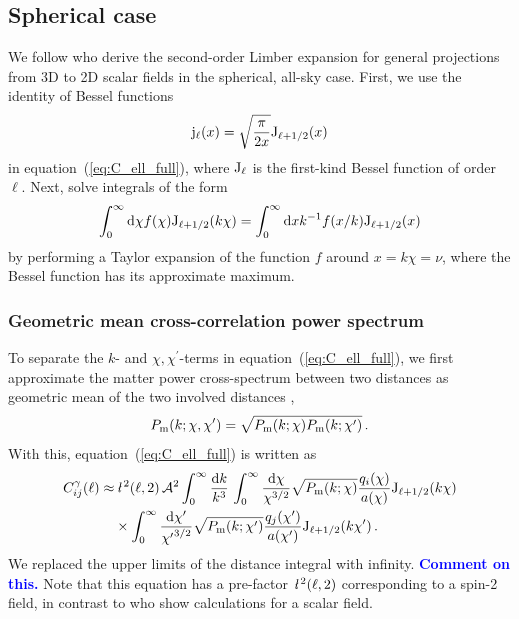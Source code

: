 \documentclass[fleqn,usenatbib]{mnras} %
\newcommand{\ellbar}{\hbox{\it \l}\,}
\newcommand{\pref}{{\cal A}}
\newcommand{\mk}[1]{{\bf\textcolor{blue}{#1}}}
\begin{document}
\subsection{Spherical case}

We follow \cite{2008PhRvD..78l3506L} who derive the second-order Limber
expansion for general projections from 3D to 2D scalar fields in the spherical,
all-sky case. First, we use the identity of Bessel functions
%
\begin{equation}
  {\rm j}_\ell(x) = \sqrt{\frac{\pi}{2x}} {\rm J}_{\ell + 1/2}(x)
\end{equation}
%
in equation~(\ref{eq:C_ell_full}), where ${\rm J}_\ell$ is the first-kind Bessel
function of order $\ell$. Next, \cite{2008PhRvD..78l3506L} solve integrals of
the form
%
\begin{equation}
  \int_0^\infty {\rm d} \chi f(\chi) {\rm J}_{\ell + 1/2}(k \chi)
  = \int_0^\infty {\rm d} x k^{-1} f(x/k) {\rm J}_{\ell + 1/2}(x)
  \label{eq:int_dchi}
\end{equation}
%
by performing a Taylor expansion of the function $f$ around $x = k \chi = \nu$, where
the Bessel function has its approximate maximum.

\subsubsection{Geometric mean cross-correlation power spectrum}

To separate the $k$- and $\chi, \chi^\prime$-terms in equation~(\ref{eq:C_ell_full}), we
first approximate the matter power cross-spectrum between two distances as
geometric mean of the two involved distances \cite{2005PhRvD..72b3516C,2016arXiv161200770K},
%
\begin{equation}
 P_{\rm m}(k; \chi, \chi^\prime) = \sqrt{ P_{\rm m}(k; \chi) P_{\rm m}(k; \chi^\prime) } \, .
  \label{eq:P_geom_mean}
\end{equation}
%
With this, equation~(\ref{eq:C_ell_full}) is written as
%
\begin{align}
  C^\gamma_{ij}(\ell) \approx & \, \ellbar^2(\ell, 2) \, \pref^2
                \int_0^\infty \frac{{\rm d} k}{k^3} \,
                \int_{0}^\infty \frac{{\rm d} \chi}{\chi^{3/2}} \sqrt{P_{\rm m}(k; \chi)}
                \frac{q_i(\chi)}{a(\chi)} {\rm J}_{\ell+1/2}(k \chi)
                \nonumber \\
                 & \times
                \int_{0}^\infty \frac{{\rm d} \chi^\prime}{{\chi^\prime}^{3/2}}
                \sqrt{P_{\rm m}(k; \chi^\prime)} \frac{q_j(\chi^\prime)}{a(\chi^\prime)} {\rm J}_{\ell+1/2}(k \chi^\prime) \, .
  \label{eq:C_ell_full_Pk}
\end{align}
%
We replaced the upper limits of the distance integral with infinity. \mk{Comment on this.}
Note that this equation has a pre-factor $\ellbar^2(\ell, 2)$ corresponding to a spin-2 field, in contrast
to \cite{2008PhRvD..78l3506L} who show calculations for a scalar field.
\end{document}
